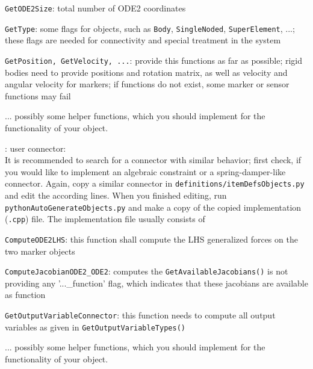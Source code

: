     \item \texttt{GetODE2Size}: total number of \ac{ODE2} coordinates
    \item \texttt{GetType}: some flags for objects, such as \texttt{Body}, \texttt{SingleNoded}, \texttt{SuperElement}, ...; these flags are needed for connectivity and special treatment in the system
    \item \texttt{GetPosition, GetVelocity, ...}: provide this functions as far as possible; rigid bodies need to provide positions and rotation matrix, as well as velocity and angular velocity for markers; if functions do not exist, some marker or sensor functions may fail
    \item ...   possibly some helper functions, which you should implement for the functionality of your object.
  \ei
  \item {}: user connector:\\
  It is recommended to search for a connector with similar behavior; first check, if you would like to implement 
  an algebraic constraint or a spring-damper-like connector.
  Again, copy a similar connector in \texttt{definitions/itemDefsObjects.py} and edit the according lines. 
  When you finished editing, run \texttt{pythonAutoGenerateObjects.py} and make a copy of the copied implementation (\texttt{.cpp}) file.
  The implementation file usually consists of
  \bi
    \item \texttt{ComputeODE2LHS}: this function shall compute the \ac{LHS} generalized forces on the two marker objects
    \item \texttt{ComputeJacobianODE2\_ODE2}: computes the \texttt{GetAvailableJacobians()} is not providing any '...\_function' flag, which indicates that these jacobians are available as function
    \item \texttt{GetOutputVariableConnector}: this function needs to compute all output variables as given in \texttt{GetOutputVariableTypes()}
    \item ...   possibly some helper functions, which you should implement for the functionality of your object.
  \ei
\ei




